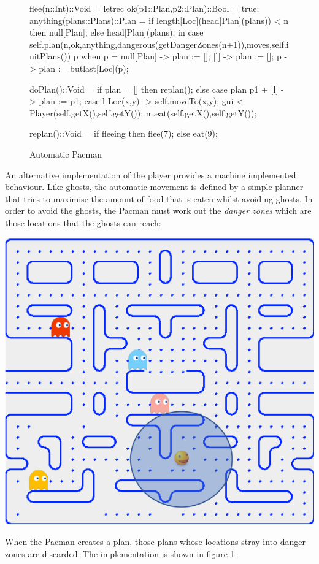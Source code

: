 \documentclass[5p,times]{elsarticle}
\begin{document}
\begin{figure}
\begin{ESL}
{  flee(n::Int)::Void =
    letrec
      ok(p1::Plan,p2::Plan)::Bool = true;
      anything(plans::Plans)::Plan = if length[Loc](head[Plan](plans)) < n then null[Plan]; else head[Plan](plans);
    in case self.plan(n,ok,anything,dangerous(getDangerZones(n+1)),moves,self.initPlans()) {
      p when p = null[Plan] -> plan := [];
      [l]                   -> plan := [];
      p                     -> plan := butlast[Loc](p);
    }

  doPlan()::Void =
    if plan = [] then replan();
    else 
      case plan {
        p1 + [l] -> { 
          plan := p1;
          case l { 
             Loc(x,y) -> { self.moveTo(x,y); gui <- Player(self.getX(),self.getY()); m.eat(self.getX(),self.getY()); }
          }
        }
      }

  replan()::Void = if fleeing then flee(7); else eat(9);
}
\end{ESL}
\caption{Automatic Pacman}
\label{fig:auto_pacman}
\end{figure}


An alternative implementation of the player provides a machine implemented behaviour. Like ghosts, the automatic movement is defined by a simple planner that tries to maximise the amount of food that is eaten whilst avoiding ghosts. In order to avoid the ghosts, the Pacman must work out the {\it danger zones} which are those locations that the ghosts can reach:
\begin{center}
\includegraphics[width=0.8\columnwidth]{pac3}
\end{center} 
When the Pacman creates a plan, those plans whose locations stray into danger zones are discarded. The implementation is shown in figure \ref{fig:auto_pacman}.
\end{document}

